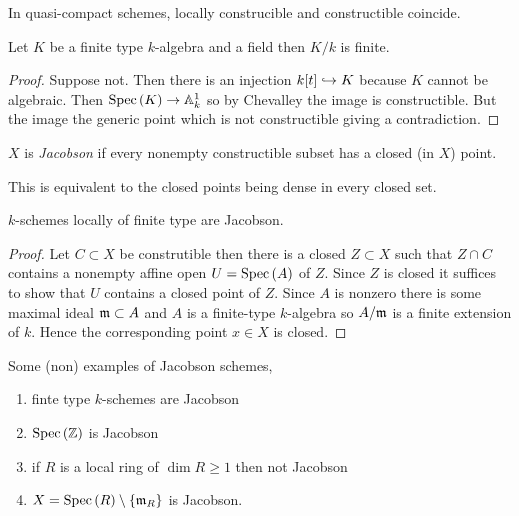 \documentclass[12pt]{article}
\begin{document}
\begin{rmk}
In quasi-compact schemes, locally construcible and constructible coincide. 
\end{rmk}

\begin{thm}[Nullstellensatz]
Let $K$ be a finite type $k$-algebra and a field then $K/k$ is finite.
\end{thm}

\begin{proof}
Suppose not. Then there is an injection $k[t] \hookrightarrow K$ because $K$ cannot be algebraic. Then $\mathrm{Spec}\left( K \right) \to \mathbb{A}^1_k$ so by Chevalley the image is constructible. But the image the generic point which is not constructible giving a contradiction. 
\end{proof}


\begin{defn}
$X$ is \textit{Jacobson} if every nonempty constructible subset has a closed (in $X$) point.
\end{defn}

\begin{rmk}
This is equivalent to the closed points being dense in every closed set.
\end{rmk}

\begin{cor}
$k$-schemes locally of finite type are Jacobson.
\end{cor}

\begin{proof}
Let $C \subset X$ be construtible then there is a closed $Z \subset X$ such that $Z \cap C$ contains a nonempty affine open $U = \mathrm{Spec}\left( A \right)$ of $Z$. Since $Z$ is closed it suffices to show that $U$ contains a closed point of $Z$. Since $A$ is nonzero there is some maximal ideal $\mathfrak{m} \subset A$ and $A$ is a finite-type $k$-algebra so $A / \mathfrak{m}$ is a finite extension of $k$. Hence the corresponding point $x \in X$ is closed.
\end{proof}


\begin{example}
Some (non) examples of Jacobson schemes,
\begin{enumerate}
\item finte type $k$-schemes are Jacobson
\item $\mathrm{Spec}\left( \mathbb{Z} \right)$ is Jacobson
\item if $R$ is a local ring of $\dim{R} \ge 1$ then not Jacobson
\item $X = \mathrm{Spec}\left( R \right) \setminus \{ \mathfrak{m}_R \}$ is Jacobson.
\end{enumerate}
\end{example}
\end{document}
